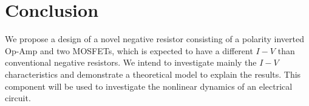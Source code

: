 \documentclass[12pt]{article}
\begin{document}
\section{Conclusion}


We propose a design of a novel negative resistor consisting of a polarity inverted Op-Amp and two MOSFETs, which is expected to have a different \(I-V\) than conventional negative resistors. We intend to investigate mainly the \(I-V\) characteristics and demonstrate a theoretical model to explain the results. This component will be used to investigate the nonlinear dynamics of an electrical circuit.


\end{document}
